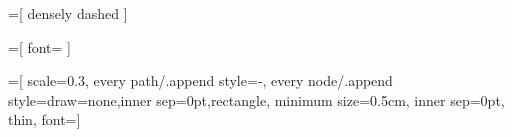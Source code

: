 \usepackage{tikz}


\newcommand{\tikzlabel}[2]{
    \ifdefined #1
        \renewcommand{#1}{#2}
    \else
        \newcommand{#1}{#2}
    \fi
}

\usepackage{etoolbox}
\makeatletter
\AtBeginDocument{%
  \patchcmd{\use@@tikzlibrary}{\global}{}{}{}%
}
\makeatother


%
%

\newcommand{\mydisable}{\tikzexternaldisable}
\newcommand{\myenable}{\tikzexternalenable}

\newcommand{\mytikzscale}{0.3}
\newcommand{\mytikzfigurewidth}{318pt} %
\newcommand{\mytikznodesize}{12.5pt}
\newcommand{\textnode}[1][]{\node[align=left,font=\mytikznormalfontsize,inner sep=0pt,rectangle,draw=none,#1]}
\newcommand{\terminalnode}[1][]{\node[rectangle,minimum size=0.4cm,solid,#1]}

\usepackage{currfile}
\providecommand{\mylabelprefix}{}
\newcommand{\mytikzfigurekey}{\mylabelprefix-\currfilename}

\newcommand{\mytikzfontsize}{\small}  %
\newcommand{\mytikzsmallfontsize}{\small}
\newcommand{\mytikznormalfontsize}{\normalsize}

=[
    densely dashed
]

=[
    font=\footnotesize
]



=[
    scale=\mytikzscale,
    every path/.append style={-},
    every node/.append style={draw=none,inner sep=0pt,rectangle},
    minimum size=0.5cm,
    inner sep=0pt,
    thin,
    font=\mytikznormalfontsize]

